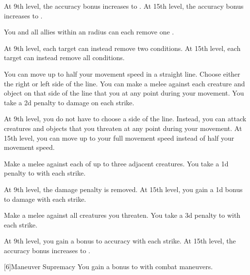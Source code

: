 {                At 9th level, the accuracy bonus increases to .
                At 15th level, the accuracy bonus increases to .

                 You and all allies within an \arealarge radius can each remove one .

                At 9th level, each target can instead remove two conditions.
                At 15th level, each target can instead remove all conditions.

                 You can move up to half your movement speed in a straight line.
                Choose either the right or left side of the line.
                You can make a melee  against each creature and object on that side of the line that you  at any point during your movement.
                You take a \minus2d penalty to damage on each strike.

                At 9th level, you do not have to choose a side of the line.
                Instead, you can attack creatures and objects that you threaten at any point during your movement.
                At 15th level, you can move up to your full movement speed instead of half your movement speed.

                 Make a melee  against each of up to three adjacent creatures.
                You take a \minus1d penalty to  with each strike.

                At 9th level, the damage penalty is removed.
                At 15th level, you gain a \plus1d bonus to damage with each strike.

                 Make a melee  against all creatures you threaten.
                You take a \minus3d penalty to  with each strike.

                At 9th level, you gain a  bonus to accuracy with each strike.
                At 15th level, the accuracy bonus increases to .
            }

            [6]{Maneuver Supremacy} You gain a  bonus to  with combat maneuvers.

